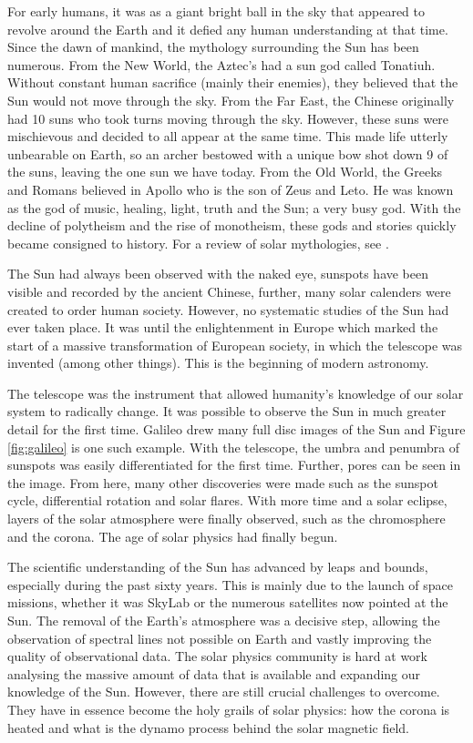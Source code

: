     For early humans, it was as a giant bright ball in the sky that appeared to revolve around the Earth and it defied any human understanding at that time.
    Since the dawn of mankind, the mythology surrounding the Sun has been numerous.    
    From the New World, the Aztec's had a sun god called Tonatiuh. 
    Without constant human sacrifice (mainly their enemies), they believed that the Sun would not move through the sky.
    From the Far East, the Chinese originally had 10 suns who took turns moving through the sky. 
    However, these suns were mischievous and decided to all appear at the same time. 
    This made life utterly unbearable on Earth, so an archer bestowed with a unique bow shot down 9 of the suns, leaving the one sun we have today.
    From the Old World, the Greeks and Romans believed in Apollo who is the son of Zeus and Leto.
    He was known as the god of music, healing, light, truth and the Sun; a very busy god.
    With the decline of polytheism and the rise of monotheism, these gods and stories quickly became consigned to history. 
    For a review of solar mythologies, see \citet{mythbook}.
    
    The Sun had always been observed with the naked eye, sunspots have been visible and recorded by the ancient Chinese, further, many solar calenders were created to order human society.
    However, no systematic studies of the Sun had ever taken place.
    It was until the enlightenment in Europe which marked the start of a massive transformation of European society, in which the telescope was invented (among other things).
    This is the beginning of modern astronomy.
    
    The telescope was the instrument that allowed humanity's knowledge of our solar system to radically change.
    It was possible to observe the Sun in much greater detail for the first time.
    Galileo drew many full disc images of the Sun and Figure \ref{fig:galileo} is one such example. 
    With the telescope, the umbra and penumbra of sunspots was easily differentiated for the first time.
    Further, pores can be seen in the image.
    From here, many other discoveries were made such as the sunspot cycle, differential rotation and solar flares.
    With more time and a solar eclipse, layers of the solar atmosphere were finally observed, such as the chromosphere and the corona.
    The age of solar physics had finally begun.
    
    The scientific understanding of the Sun has advanced by leaps and bounds, especially during the past sixty years.
    This is mainly due to the launch of space missions, whether it was SkyLab or the numerous satellites now pointed at the Sun.
    The removal of the Earth's atmosphere was a decisive step, allowing the observation of spectral lines not possible on Earth and vastly improving the quality of observational data.
    The solar physics community is hard at work analysing the massive amount of data that is available and expanding our knowledge of the Sun.   
    However, there are still crucial challenges to overcome.
    They have in essence become the holy grails of solar physics: how the corona is heated and what is the dynamo process behind the solar magnetic field.

